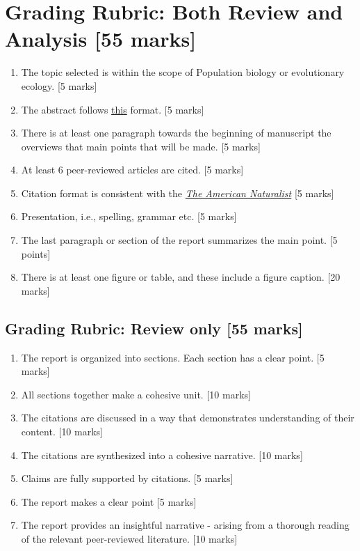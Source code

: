 \documentclass[]{book}
\begin{document}
\section{Grading Rubric: Both Review and Analysis {[}55
marks{]}}\label{grading-rubric-both-review-and-analysis-55-marks}

\begin{enumerate}
\def\labelenumi{\arabic{enumi}.}
\item
  The topic selected is within the scope of Population biology or
  evolutionary ecology. {[}5 marks{]}
\item
  The abstract follows
  \href{https://www.google.com/url?sa=t\&rct=j\&q=\&esrc=s\&source=web\&cd=\&ved=2ahUKEwjH9pDIya_sAhXig-AKHcB3BusQFjAAegQIBhAC\&url=http\%3A\%2F\%2Fwww.cbs.umn.edu\%2Fsites\%2Fdefault\%2Ffiles\%2Fpublic\%2Fdownloads\%2FAnnotated_Nature_abstract.pdf\&usg=AOvVaw2FzVPRcUQOUX2zEJXld9LQ}{this}
  format. {[}5 marks{]}
\item
  There is at least one paragraph towards the beginning of manuscript
  the overviews that main points that will be made. {[}5 marks{]}
\item
  At least 6 peer-reviewed articles are cited. {[}5 marks{]}
\item
  Citation format is consistent with the
  \href{https://www.journals.uchicago.edu/journals/an/instruct?mobileUi=0\#manuscript-format}{\emph{The
  American Naturalist}} {[}5 marks{]}
\item
  Presentation, i.e., spelling, grammar etc. {[}5 marks{]}
\item
  The last paragraph or section of the report summarizes the main point.
  {[}5 points{]}
\item
  There is at least one figure or table, and these include a figure
  caption. {[}20 marks{]}
\end{enumerate}

\subsection{Grading Rubric: Review only {[}55
marks{]}}\label{grading-rubric-review-only-55-marks}

\begin{enumerate}
\def\labelenumi{\arabic{enumi}.}
\item
  The report is organized into sections. Each section has a clear point.
  {[}5 marks{]}
\item
  All sections together make a cohesive unit. {[}10 marks{]}
\item
  The citations are discussed in a way that demonstrates understanding
  of their content. {[}10 marks{]}
\item
  The citations are synthesized into a cohesive narrative. {[}10
  marks{]}
\item
  Claims are fully supported by citations. {[}5 marks{]}
\item
  The report makes a clear point {[}5 marks{]}
\item
  The report provides an insightful narrative - arising from a thorough
  reading of the relevant peer-reviewed literature. {[}10 marks{]}
\end{enumerate}
\end{document}
